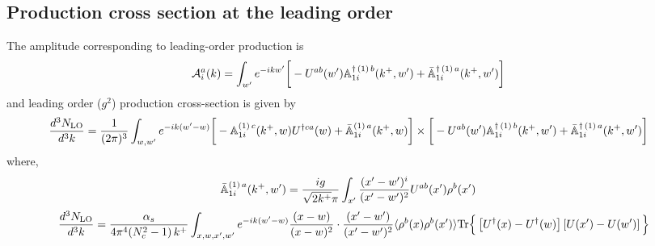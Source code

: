 \documentclass[aps,prd,amsmath,amssymb,nofootinbib]{revtex4-2}
\def\mf#1{\mathbb{#1}}
\numberwithin{equation}{section}
\begin{document}
\subsection{Production cross section at the leading order}
The amplitude corresponding to leading-order production is
\begin{align}
   {\cal A}^{a}_{i}(k) & = \int_{w^{\prime}} e^{-ikw^{\prime}} \bigg[-U^{ab}(w^{\prime})\mf{A}^{\dagger\,(1)\, b}_{1i}(k^{+},w^{\prime})+\Bar{\mf{A}}^{\dagger\, (1)\, a}_{1i}(k^{+}, w^{\prime})\bigg]
\end{align}
and leading order ($g^2$) production cross-section is given by
\begin{align}
    \frac{d^{3}N_{\rm LO}}{d^{3}k} & = \frac{1}{(2\pi)^{3}} \int_{w,w^{\prime}} e^{-ik(w^{\prime}-w)} \bigg[-\mf{A}^{(1)\, c}_{1i}(k^{+},w)U^{\dagger ca}(w)+\Bar{\mf{A}}^{(1)\, a}_{1i}(k^{+}, w)\bigg]\times \bigg[-U^{ab}(w^{\prime})\mf{A}^{\dagger\,(1)\, b}_{1i}(k^{+},w^{\prime})+\Bar{\mf{A}}^{\dagger\, (1)\, a}_{1i}(k^{+}, w^{\prime})\bigg]
\end{align}
where,
\begin{align}
    \Bar{\mf{A}}^{(1)\, a}_{1i}(k^{+},w^{\prime}) & = \frac{ig}{\sqrt{2k^+}\pi}\int_{x^{\prime}}\frac{(x^{\prime}-w^{\prime})^{i}}{(x^{\prime}-w^{\prime})^{2}} U^{ab}(x^{\prime})\rho^{b}(x^{\prime}) 
\end{align}
\begin{align}
    \frac{d^{3}N_{\rm LO}}{d^{3}k} = \frac{\alpha_s } {4\pi^{4} (N_c^2-1)\, k^{+}}\int_{x,w,x^{\prime},w^{\prime}}
    e^{-ik(w^{\prime}-w)} 
    \frac{(x-w)}{(x-w)^{2}} \cdot
    \frac{(x^{\prime}-w^{\prime})}{(x^{\prime}-w^{\prime})^{2}}
   \langle  \rho^{b}(x) \rho^{b}(x^{\prime}) \rangle
    {\rm Tr} \Big\{\left[U^{\dagger}(x)-U^{\dagger}(w)\right]\left[U(x^{\prime})-U(w^{\prime})\right]\Big\}
\end{align}
\end{document}
